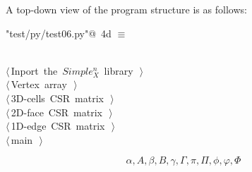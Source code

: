 \documentclass[11pt,oneside]{article}	%
\begin{document}
A top-down view of the program structure is as follows:

\begin{flushleft} \small \label{scrap8}
\protect{}\verb@"test/py/test06.py"@\nobreak\ {\footnotesize 4d }$\equiv$
\vspace{-1ex}
\begin{list}{}{} \item
\mbox{}\verb@@\\
\mbox{}\verb@@\hbox{$\langle\,$Inport the $Simple_X^n$ library\nobreak\ {\footnotesize {}}$\,\rangle$}\verb@@\\
\mbox{}\verb@@\hbox{$\langle\,$Vertex array\nobreak\ {\footnotesize {}}$\,\rangle$}\verb@@\\
\mbox{}\verb@@\hbox{$\langle\,$3D-cells CSR matrix\nobreak\ {\footnotesize {}}$\,\rangle$}\verb@@\\
\mbox{}\verb@@\hbox{$\langle\,$2D-face CSR matrix\nobreak\ {\footnotesize {}}$\,\rangle$}\verb@@\\
\mbox{}\verb@@\hbox{$\langle\,$1D-edge CSR matrix\nobreak\ {\footnotesize {}}$\,\rangle$}\verb@@\\
\mbox{}\verb@@\hbox{$\langle\,$main\nobreak\ {\footnotesize {}}$\,\rangle$}\verb@@\\
\mbox{}\verb@@{\NWsep}
\end{list}
\vspace{-2ex}
\end{flushleft}

\[
\alpha, A, \beta, B, \gamma, \Gamma, \pi, \Pi, \phi, \varphi, \Phi
\]
\end{document}
